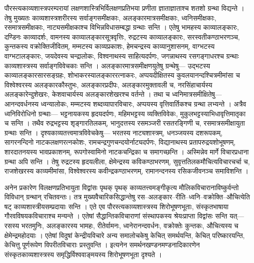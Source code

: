 \documentclass[10pt, a5paper, twoside]{article}
\begin{document}
पौरस्त्यकाव्यशास्त्रपरम्परायां लक्षणशास्त्रिभिर्विलक्षणप्रतिभया प्रणीता ज्ञाताज्ञाताश्च शतशो ग्रन्था विद्यन्ते । तेषु मुख्यतः काव्यशास्त्रशरीरस्य सर्वाङ्गसमीक्षकाः, अलङ्कारमात्रसमीक्षकाः, ध्वनिसमीक्षकाः, रसमात्रसमीक्षकाः, नाट्यसमीक्षकाश्च विभिन्नविधासम्बद्धा ग्रन्थाः सन्ति । एतेषु भामहस्य काव्यालङ्कारः, दण्डिनः काव्यादर्शः, वामनस्य काव्यालङ्कारसूत्रवृत्तिः, रुद्रटस्य काव्यालङ्कारः, सरस्वतीकण्ठाभरणञ्च, कुन्तकस्य वक्रोक्तिजीवितम्, मम्मटस्य काव्यप्रकाशः, हेमचन्द्रस्य काव्यानुशासनम्, वाग्भटस्य वाग्भटालङ्कारः, जयदेवस्य चन्द्रालोकः, विश्वनाथस्य साहित्यदर्पणः, जगन्नाथस्य रसगङ्गाधरश्च ग्रन्थाः काव्यशास्त्रस्य सर्वाङ्गविवेचकाः सन्ति । अलङ्कारमात्रसमीक्षणयुतेषु ग्रन्थेषु—  उद्भटस्य काव्यालङ्कारसारसङ्ग्रहः, शोभाकरस्यालङ्काररत्नाकरः,  अप्पयदीक्षितस्य कुवलयानन्दश्चित्रमीमांसा च विश्वेश्वरस्य अलङ्कारकौस्तुभः, अलङ्कारप्रदीपः, अलङ्कारमुक्तावली च, नरसिंहाचार्यस्य अलङ्कारेन्दुशेखरः, केशवाचार्यस्य अलङ्कारशेखरश्च वर्तन्ते । तथा च ध्वनिमात्रसमीक्षितेषु— आनन्दवर्धनस्य ध्वन्यालोकः, मम्मटस्य शब्दव्यापारविचारः, अप्पयस्य वृत्तिवार्तिकश्च ग्रन्था लभ्यन्ते । अत्रैव ध्वनिविरोधिनो  ग्रन्थाः— भट्टनायकस्य हृदयदर्पणः, महिमभट्टस्य व्यक्तिविवेकः, मुकुलभट्टस्याभिधावृत्तिमातृका च सन्ति । तथैव रुद्रभट्टस्य शृङ्गारतिलकम्, भानुदत्तस्य रसमञ्जरी रसतरङ्गिणी च, रसमात्रसमीक्षायुता ग्रन्थाः सन्ति । दृश्यकाव्यतत्त्वमात्रविवेचकेषु— भरतस्य नाट्यशास्त्रम्, धनञ्जयस्य दशरूपकम्, सागरनन्दिनो नाटकलक्षणरत्नकोशः, रामचन्द्रगुणचन्दयोर्नाट्यदर्पणः, विद्यानाथस्य प्रतापरुद्रयशोभूषणम्, शारदातनयस्य भावप्रकाशनम्, रूपगोस्वामिनो नाटकचन्द्रिका च समागच्छन्ति । अस्मिन्नेव मार्गे विचारप्रधाना ग्रन्था अपि सन्ति । तेषु रुद्रटस्य हृदयलीला, क्षेमेन्द्रस्य कविकण्ठाभरणम्, सुवृत्ततिलकमौचित्यविचारचर्चा च, राजशेखरस्य काव्यमीमांसा, विश्वेश्वरस्य कवीन्द्रकण्ठाभरणम्, रामानन्दनस्य रसिकजीवनञ्च समाविशन्ति ।

अनेन प्रकारेण विलक्षणप्रतिभायुता विद्वांसः पृथक् पृथक् काव्यतत्त्वमङ्गीकृत्य मौलिकविचारानाविष्कुर्वन्तो विविधान् ग्रन्थान् रचितवन्तः। तत्र मुख्यवैचारिकसिद्धान्तेषु रस–अलङ्कार–रीति–ध्वनि–वक्रोक्ति–औचित्येति षट् काव्यशास्त्रीयसम्प्रदायाः सन्ति । एते एव पौरस्त्यकाव्यशास्त्रस्य शिरोभूषणभूताः, संस्कृतभाषाया गौरवविषयकविचाराश्च मन्यन्ते । एतेषां सैद्धान्तिकविचाराणां संस्थापकस्य श्रेयःप्राप्ता विद्वांसः सन्ति यत्— रसस्य भरतमुनिः, अलङ्कारस्य भामहः, रीतेर्वामनः, ध्वनेरानन्दवर्धनः, वक्रोक्तेः कुन्तकः, औचित्यस्य च क्षेमेन्द्रमहोदयाः । एतेषां विदुषां केन्द्रीयविचारे अन्य समालोचकेषु केचित् समर्थयन्ति, केचित् परिष्कारयन्ति, केचित्तु पूर्णरूपेण विपरीतविचाराः प्रस्तुवन्ति । इत्यनेन  समर्थनखण्डनमण्डनादिकारणेन संस्कृतकाव्यशास्त्रस्य समृद्धिर्विश्ववाङ्मयस्य शिरोभूषणभूता दृश्यते ।
\end{document}
